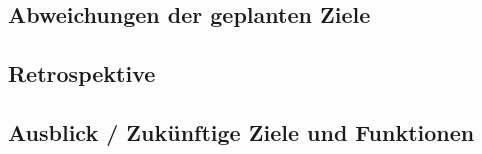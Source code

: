 \subsection{Abweichungen der geplanten Ziele}\label{subsec:AbweichungenDerGeplantenZiele}

\subsection{Retrospektive}\label{subsec:Retrospektive}

\subsection{Ausblick / Zukünftige Ziele und Funktionen}\label{subsec:AusblickZukuenftigeZieleUndFunktionen}